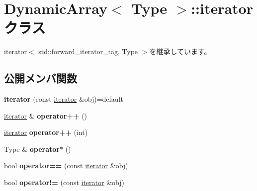 \hypertarget{class_dynamic_array_1_1iterator}{}\section{Dynamic\+Array$<$ Type $>$\+:\+:iterator クラス}
\label{class_dynamic_array_1_1iterator}


iterator$<$ std\+::forward\+\_\+iterator\+\_\+tag, Type $>$を継承しています。

\subsection*{公開メンバ関数}
\begin{DoxyCompactItemize}
\item 
{\bfseries iterator} (const \hyperlink{class_dynamic_array_1_1iterator}{iterator} \&obj)=default\hypertarget{class_dynamic_array_1_1iterator_a6b3ee370b952a5b94c5cb6a413f17b34}{}\label{class_dynamic_array_1_1iterator_a6b3ee370b952a5b94c5cb6a413f17b34}

\item 
\hyperlink{class_dynamic_array_1_1iterator}{iterator} \& {\bfseries operator++} ()\hypertarget{class_dynamic_array_1_1iterator_a1610f38caaee3e7329d51955823ce28a}{}\label{class_dynamic_array_1_1iterator_a1610f38caaee3e7329d51955823ce28a}

\item 
\hyperlink{class_dynamic_array_1_1iterator}{iterator} {\bfseries operator++} (int)\hypertarget{class_dynamic_array_1_1iterator_a8f2290cad6416b5338e2bd1d39eba4bd}{}\label{class_dynamic_array_1_1iterator_a8f2290cad6416b5338e2bd1d39eba4bd}

\item 
Type \& {\bfseries operator$\ast$} ()\hypertarget{class_dynamic_array_1_1iterator_a05c13703c8c8f10270749ab9ae3b8024}{}\label{class_dynamic_array_1_1iterator_a05c13703c8c8f10270749ab9ae3b8024}

\item 
bool {\bfseries operator==} (const \hyperlink{class_dynamic_array_1_1iterator}{iterator} \&obj)\hypertarget{class_dynamic_array_1_1iterator_a42d66e04b53af571201f0bfe39353591}{}\label{class_dynamic_array_1_1iterator_a42d66e04b53af571201f0bfe39353591}

\item 
bool {\bfseries operator!=} (const \hyperlink{class_dynamic_array_1_1iterator}{iterator} \&obj)\hypertarget{class_dynamic_array_1_1iterator_a3a109c1436e7e2a6fc760948ab0c1823}{}\label{class_dynamic_array_1_1iterator_a3a109c1436e7e2a6fc760948ab0c1823}

\end{DoxyCompactItemize}
